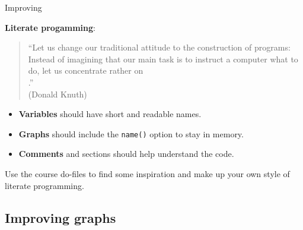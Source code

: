 \documentclass[t]{beamer}
\begin{document}
	\begin{frame}[t]{Improving }

		\textbf{Literate progamming}: \\
		\begin{quote}``Let us change our traditional attitude to the construction of programs: Instead of imagining that our main task is to instruct a computer what to do, let us concentrate rather on\\ .''\\(Donald Knuth)\end{quote}
			
		\begin{itemize}

			\item \textbf{Variables} should have short and readable names.
			
			\item \textbf{Graphs} should include the \texttt{name()} option to stay in memory.
			
			\item \textbf{Comments} and sections should help understand the code.
		\end{itemize}

		Use the course do-files to find some inspiration and make up your own style of literate programming.
	\end{frame}

	\subsection{Improving graphs}
			
\end{document}
